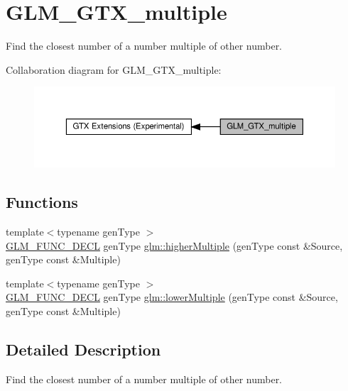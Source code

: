 \hypertarget{group__gtx__multiple}{}\section{G\+L\+M\+\_\+\+G\+T\+X\+\_\+multiple}
\label{group__gtx__multiple}


Find the closest number of a number multiple of other number.  


Collaboration diagram for G\+L\+M\+\_\+\+G\+T\+X\+\_\+multiple\+:\nopagebreak
\begin{figure}[H]
\begin{center}
\leavevmode
\includegraphics[width=350pt]{group__gtx__multiple}
\end{center}
\end{figure}
\subsection*{Functions}
\begin{DoxyCompactItemize}
\item 
{\footnotesize template$<$typename gen\+Type $>$ }\\\hyperlink{setup_8hpp_ab2d052de21a70539923e9bcbf6e83a51}{G\+L\+M\+\_\+\+F\+U\+N\+C\+\_\+\+D\+E\+CL} gen\+Type \hyperlink{group__gtx__multiple_gaa2bb85aaacfdb9366b8365f8d5c7e25d}{glm\+::higher\+Multiple} (gen\+Type const \&Source, gen\+Type const \&Multiple)
\item 
{\footnotesize template$<$typename gen\+Type $>$ }\\\hyperlink{setup_8hpp_ab2d052de21a70539923e9bcbf6e83a51}{G\+L\+M\+\_\+\+F\+U\+N\+C\+\_\+\+D\+E\+CL} gen\+Type \hyperlink{group__gtx__multiple_ga11b955f3cb3589d561c8991118771ea6}{glm\+::lower\+Multiple} (gen\+Type const \&Source, gen\+Type const \&Multiple)
\end{DoxyCompactItemize}


\subsection{Detailed Description}
Find the closest number of a number multiple of other number. 

